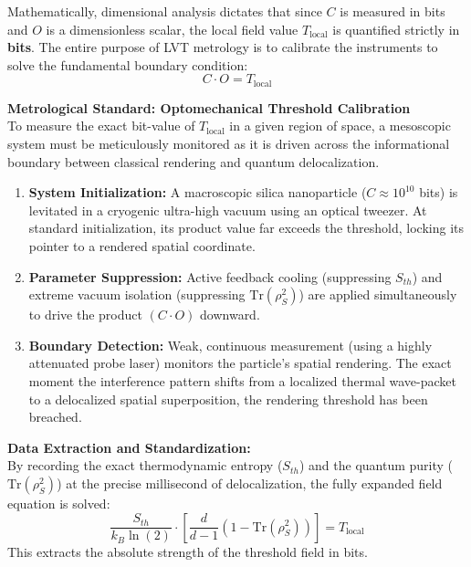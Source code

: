 \documentclass[12pt,a4paper]{article}
\begin{document}
Mathematically, dimensional analysis dictates that since $C$ is measured in bits and $O$ is a dimensionless scalar, the local field value $T_{\mathrm{local}}$ is quantified strictly in \textbf{bits}. The entire purpose of LVT metrology is to calibrate the instruments to solve the fundamental boundary condition:
\begin{equation}
\boxed{ C \cdot O = T_{\mathrm{local}} }
\end{equation}

\textbf{Metrological Standard: Optomechanical Threshold Calibration} \\
To measure the exact bit-value of $T_{\mathrm{local}}$ in a given region of space, a mesoscopic system must be meticulously monitored as it is driven across the informational boundary between classical rendering and quantum delocalization.

\begin{enumerate}
    \item \textbf{System Initialization:} A macroscopic silica nanoparticle ($C \approx 10^{10}$ bits) is levitated in a cryogenic ultra-high vacuum using an optical tweezer. At standard initialization, its product value far exceeds the threshold, locking its pointer to a rendered spatial coordinate.
    \item \textbf{Parameter Suppression:} Active feedback cooling (suppressing $S_{th}$) and extreme vacuum isolation (suppressing $\text{Tr}(\rho_S^2)$) are applied simultaneously to drive the product $(C \cdot O)$ downward.
    \item \textbf{Boundary Detection:} Weak, continuous measurement (using a highly attenuated probe laser) monitors the particle's spatial rendering. The exact moment the interference pattern shifts from a localized thermal wave-packet to a delocalized spatial superposition, the rendering threshold has been breached.
\end{enumerate}



\textbf{Data Extraction and Standardization:} \\
By recording the exact thermodynamic entropy ($S_{th}$) and the quantum purity ($\text{Tr}(\rho_S^2)$) at the precise millisecond of delocalization, the fully expanded field equation is solved:
\begin{equation}
\frac{S_{th}}{k_B \ln(2)} \cdot \left[ \frac{d}{d-1} \left( 1 - \text{Tr}(\rho_S^2) \right) \right] = T_{\mathrm{local}}
\end{equation}
This extracts the absolute strength of the threshold field in bits. 
\end{document}

